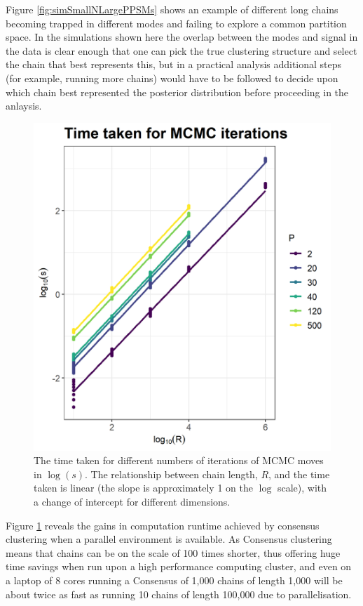 \documentclass{bioinfo}
\begin{document}
Figure \ref{fig:simSmallNLargePPSMs} shows an example of different long chains becoming trapped in different modes and failing to explore a common partition space. In the simulations shown here the overlap between the modes and signal in the data is clear enough that one can pick the true clustering structure and select the chain that best represents this, but in a practical analysis additional steps (for example, running more chains) would have to be followed to decide upon which chain best represented the posterior distribution before proceeding in the anlaysis.

\begin{figure} %
	\centering
	\includegraphics[scale=0.45]{./Images/Simulations/TimeComparison.png}	
	\caption{The time taken for different numbers of iterations of MCMC moves in $\log(s)$. The relationship between chain length, $R$, and the time taken is linear (the slope is approximately 1 on the $\log$ scale), with a change of intercept for different dimensions.}
	\label{fig:timeMCMC}
\end{figure}

Figure \ref{fig:timeMCMC} reveals the gains in computation runtime achieved by consensus clustering when a parallel environment is available. As Consensus clustering means that chains can be on the scale of 100 times shorter, thus offering huge time savings when run upon a high performance computing cluster, and even on a laptop of 8 cores running a Consensus of 1,000 chains of length 1,000 will be about twice as fast as running 10 chains of length 100,000 due to parallelisation.
\end{document}
